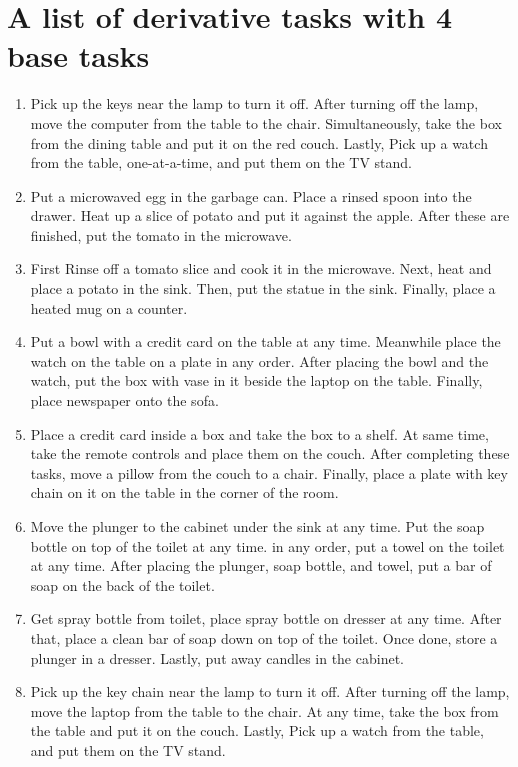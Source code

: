 \documentclass{article}
\begin{document}
\section*{A list of derivative tasks with 4 base tasks}
\begin{enumerate}
    \item Pick up the keys near the lamp to turn it off. After turning off the lamp, move the computer from the table to the chair. Simultaneously, take the box from the dining table and put it on the red couch. Lastly, Pick up a watch from the table, one-at-a-time, and put them on the TV stand.
    \item Put a microwaved egg in the garbage can. Place a rinsed spoon into the drawer. Heat up a slice of potato and put it against the apple. After these are finished, put the tomato in the microwave.
    \item First Rinse off a tomato slice and cook it in the microwave. Next, heat and place a potato in the sink. Then, put the statue in the sink. Finally, place a heated mug on a counter.
    \item Put a bowl with a credit card on the table at any time. Meanwhile place the watch on the table on a plate in any order. After placing the bowl and the watch, put the box with vase in it beside the laptop on the table. Finally, place newspaper onto the sofa.
    \item Place a credit card inside a box and take the box to a shelf. At same time, take the remote controls and place them on the couch. After completing these tasks, move a pillow from the couch to a chair. Finally, place a plate with key chain on it on the table in the corner of the room.
    \item Move the plunger to the cabinet under the sink at any time. Put the soap bottle on top of the toilet at any time. in any order, put a towel on the toilet at any time. After placing the plunger, soap bottle, and towel, put a bar of soap on the back of the toilet.
    \item Get spray bottle from toilet, place spray bottle on dresser at any time. After that, place a clean bar of soap down on top of the toilet. Once done, store a plunger in a  dresser. Lastly, put away candles in the cabinet.
    \item Pick up the key chain near the lamp to turn it off. After turning off the lamp, move the laptop from the table to the chair. At any time, take the box from the table and put it on the couch. Lastly, Pick up a watch from the table,  and put them on the TV stand.

\end{enumerate}
\end{document}
